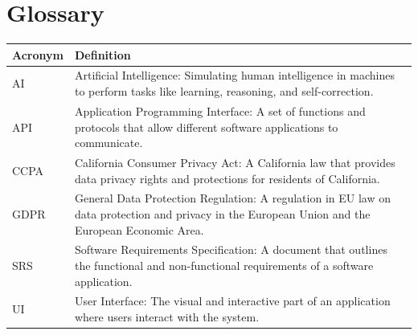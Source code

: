 \documentclass{article}
\begin{document}
\section{Glossary}
\begin{longtable}{|p{3cm}|p{10cm}|}
\hline
\textbf{Acronym} & \textbf{Definition} \\ \hline
AI & Artificial Intelligence: Simulating human intelligence in machines to perform tasks like learning, reasoning, and self-correction. \\ \hline
API & Application Programming Interface: A set of functions and protocols that allow different software applications to communicate. \\ \hline
CCPA & California Consumer Privacy Act: A California law that provides data privacy rights and protections for residents of California. \\ \hline
GDPR & General Data Protection Regulation: A regulation in EU law on data protection and privacy in the European Union and the European Economic Area. \\ \hline
SRS & Software Requirements Specification: A document that outlines the functional and non-functional requirements of a software application. \\ \hline
UI & User Interface: The visual and interactive part of an application where users interact with the system. \\ \hline
\end{longtable}


\printglossaries
\end{document}
